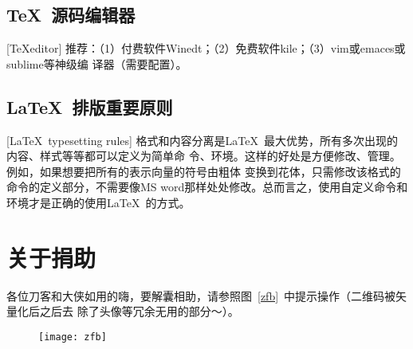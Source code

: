 \subsection{\TeX\ 源码编辑器}[\TeX editor]
推荐：（1）付费软件Winedt；（2）免费软件kile；（3）vim或emaces或sublime等神级编
译器（需要配置）。

\subsection{\LaTeX\ 排版重要原则}[\LaTeX\ typesetting rules]
格式和内容分离是\LaTeX\ 最大优势，所有多次出现的内容、样式等等都可以定义为简单命
令、环境。这样的好处是方便修改、管理。例如，如果想要把所有的表示向量的符号由粗体
变换到花体，只需修改该格式的命令的定义部分，不需要像MS
word那样处处修改。总而言之，使用自定义命令和环境才是正确的使用\LaTeX\ 的方式。

\section{关于捐助}
各位刀客和大侠如用的嗨，要解囊相助，请参照图~\ref{zfb}~中提示操作（二维码被矢量化后之后去
除了头像等冗余无用的部分～）。

\begin{figure}[!h]
	\centering\texttt{[image: zfb]}
	\vspace{0.2em}
\end{figure}


